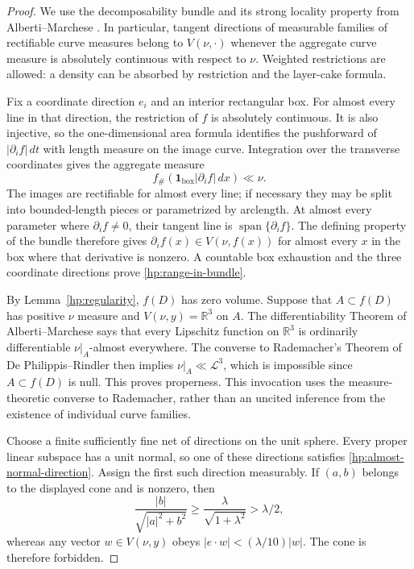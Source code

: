 \documentclass[11pt]{article}
\numberwithin{equation}{section}
\theoremstyle{definition}
\theoremstyle{remark}
\begin{document}
\begin{proof}
We use the decomposability bundle and its strong locality property
from Alberti--Marchese \cite[Section~2.6 and Proposition~2.9(i)]
{AlbertiMarchese2016}.  In particular, tangent directions of measurable
families of rectifiable curve measures belong to $V(\nu,\cdot)$
whenever the aggregate curve measure is absolutely continuous with
respect to $\nu$.  Weighted restrictions are allowed: a density can
be absorbed by restriction and the layer-cake formula.

Fix a coordinate direction $e_i$ and an interior rectangular box.
For almost every line in that direction, the restriction of $f$ is
absolutely continuous.  It is also injective, so the one-dimensional
area formula identifies the pushforward of
$|\partial_i f|\,dt$ with length measure on the image curve.
Integration over the transverse coordinates gives the aggregate
measure
\[
 f_\#(\mathbf1_{\text{box}}|\partial_i f|\,dx)\ll\nu.
\]
The images are rectifiable for almost every line; if necessary they
may be split into bounded-length pieces or parametrized by arclength.
At almost every parameter where $\partial_i f\ne0$, their tangent
line is $\operatorname{span}\{\partial_i f\}$.  The defining property
of the bundle therefore gives
$\partial_i f(x)\in V(\nu,f(x))$ for almost every $x$ in the box
where that derivative is nonzero.  A countable box exhaustion and the
three coordinate directions prove \eqref{hp:range-in-bundle}.

By Lemma~\ref{hp:regularity}, $f(D)$ has zero volume.  Suppose that
$A\subset f(D)$ has positive $\nu$ measure and
$V(\nu,y)=\mathbb R^3$ on $A$.  The differentiability Theorem of
Alberti--Marchese \cite[Theorem~1.1(i)]{AlbertiMarchese2016} says that
every Lipschitz function on $\mathbb R^3$ is ordinarily differentiable
$\nu\vert_A$-almost everywhere.  The converse to Rademacher's Theorem
of De Philippis--Rindler \cite[Theorem~1.14]{DePhilippisRindler2016}
then implies $\nu\vert_A\ll\mathcal L^3$, which is impossible since
$A\subset f(D)$ is null.  This proves properness.  This invocation
uses the measure-theoretic converse to Rademacher, rather than an
uncited inference from the existence of individual curve families.

Choose a finite sufficiently fine net of directions on the unit
sphere.  Every proper linear subspace has a unit normal, so one
of these directions satisfies \eqref{hp:almost-normal-direction}.
Assign the first such direction measurably.  If $(a,b)$ belongs to
the displayed cone and is nonzero, then
\[
 \frac{|b|}{\sqrt{|a|^2+b^2}}
 \ge\frac{\lambda}{\sqrt{1+\lambda^2}}>\lambda/2,
\]
whereas any vector $w\in V(\nu,y)$ obeys
$|e\cdot w|< (\lambda/10)|w|$.  The cone is therefore forbidden.
\end{proof}
\end{document}

